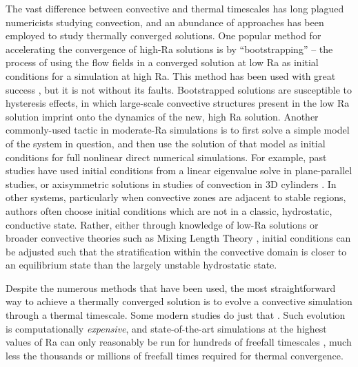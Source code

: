 \documentclass[aps, pre, onecolumn, nofootinbib, notitlepage, groupedaddress, amsfonts, amssymb, amsmath, longbibliography]{revtex4-1}
\begin{document}
The vast difference between convective and thermal timescales has long plagued
numericists studying convection, and an abundance of approaches has been employed to
study thermally converged solutions. One popular method for accelerating the convergence
of high-Ra solutions is by ``bootstrapping'' -- the process of using the flow
fields in a converged solution at low Ra as initial conditions for a simulation at high
Ra.  This method has been used with great success \cite{johnston&doering2009, verzicco&camussi1997},
but it is not without its faults.  Bootstrapped solutions are susceptible to hysteresis
effects, in which large-scale convective structures present in the
low Ra solution imprint onto the dynamics of the new, high Ra solution. 
Another commonly-used tactic in
moderate-Ra simulations is to first solve a simple model of the system in question,
and then use the solution of that model as initial conditions for full nonlinear
direct numerical simulations. For example, past studies have used initial conditions from
a linear eigenvalue solve \cite{hurlburt&all1984} in plane-parallel studies, or
axisymmetric solutions in studies of convection in 3D cylinders \cite{verzicco&camussi1997}. 
In other systems, particularly when convective zones are adjacent to stable regions,
authors often choose initial conditions which are not in a classic, hydrostatic,
conductive state. Rather, either through knowledge of low-Ra solutions \cite{couston&all2017}
or broader convective theories such as Mixing Length Theory
\cite{brandenburg&all2005}, initial conditions can be adjusted such that the stratification
within the convective domain is closer to an equilibrium state than the largely
unstable hydrostatic state.

Despite the numerous methods that have been used,
the most straightforward way to achieve a thermally converged solution
is to evolve a convective simulation through a thermal timescale. Some modern
studies do just that \cite{featherstone&hindman2016}.
Such evolution is computationally 
\emph{expensive}, and state-of-the-art simulations at the highest values of Ra
can only reasonably be run
for hundreds of freefall timescales \cite{stevens&all2011}, much less the
thousands or millions of freefall times required for thermal convergence.
\end{document}
